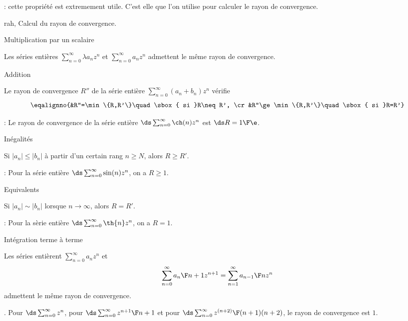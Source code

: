 \Remarque : cette propri\'et\'e est extremement utile. C'est elle que l'on utilise pour calculer le rayon de convergence. 


\Subsection rah, Calcul du rayon de convergence. 


\Concept [Index=Rayon de convergence!Multiplication par un scalaire] Multiplication par un scalaire

Les s\'eries enti\`eres $\sum_{n=0}^\infty\lambda a_nz^n$ et $\sum_{n=0}^\infty a_nz^n$ admettent le m\^eme rayon de convergence.  

\Concept [Index=Rayon de convergence!Addition] Addition

\Propriete [$R$ et $R'$ rayons de convergences de $\sum_{n=0}^\infty a_nz^n$ et $\sum_{n=0}^\infty b_nz^n$]
Le rayon de convergence $R''$ de la s\'erie enti\`ere $\sum_{n=0}^\infty(a_n+b_n)z^n$ v\'erifie 
$$
\eqalignno{&R''=\min\{R,R'\}\quad\sbox{ si }R\neq R', \cr
&R''\ge\min\{R,R'\}\quad\sbox{ si }R=R'} 
$$

\Application : Le rayon de convergence de la s\'erie enti\`ere $\ds\sum_{n=0}^\infty\ch(n)z^n$ est $\ds R={1\F\e}$. 

\Concept [Index=Rayon de convergence!Inegalites@In\'egalit\'es] In\'egalit\'es

\Propriete [$R$ et $R'$ rayons de convergences de $\sum_{n=0}^\infty a_nz^n$ et $\sum_{n=0}^\infty b_nz^n$]
Si $|a_n|\le |b_n|$ \`a partir d'un certain rang $n\ge N$, alors $R\ge R'$. 

\Application : Pour la s\'erie enti\`ere $\ds\sum_{n=0}^\infty\sin(n) z^n$, on a $R\ge 1$. 

\Concept [Index=Rayon de convergence!Equivalents] Equivalents

\Propriete [$R$ et $R'$ rayons de convergences de $\sum_{n=0}^\infty a_nz^n$ et $\sum_{n=0}^\infty b_nz^n$]
Si $|a_n|\sim|b_n|$ lorsque $n\to\infty$, alors $R=R'$. 

\Application : Pour la s\`erie enti\`ere $\ds\sum_{n=0}^\infty\th{n}z^n$, on a $R=1$. 

\Concept [Index=Rayon de convergence!Integration terme a terme] Int\'egration terme \`a terme

Les s\'eries enti\`erent $\sum_{n=0}^\infty a_nz^n$ et 
$$
\sum\limits_{n=0}^\infty {a_n\F n+1}z^{n+1}=\sum_{n=1}^\infty{a_{n-1}\F n}z^n
$$
admettent le m\^eme rayon de convergence. 

\Exemple. Pour $\ds\sum_{n=0}^\infty z^n$, pour $\ds\sum_{n=0}^\infty{z^{n+1}\F n+1}$ et pour 
$\ds\sum_{n=0}^\infty{z^{(n+2)}\F (n+1)(n+2)}$, le rayon de convergence est $1$. 

